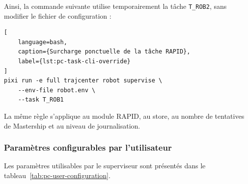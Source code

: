 \documentclass{rapportENSAM}
\begin{document}
Ainsi, la commande suivante utilise temporairement la tâche
\texttt{T\_ROB2}, sans modifier le fichier de configuration :

\begin{lstlisting}[
    language=bash,
    caption={Surcharge ponctuelle de la tâche RAPID},
    label={lst:pc-task-cli-override}
]
pixi run -e full trajcenter robot supervise \
    --env-file robot.env \
    --task T_ROB1
\end{lstlisting}

La même règle s'applique au module RAPID, au store, au nombre de tentatives de
Mastership et au niveau de journalisation.

\subsubsection{Paramètres configurables par l'utilisateur}
\label{subsubsec:pc-user-configuration}

Les paramètres utilisables par le superviseur sont présentés dans le
tableau~\ref{tab:pc-user-configuration}.
\end{document}
